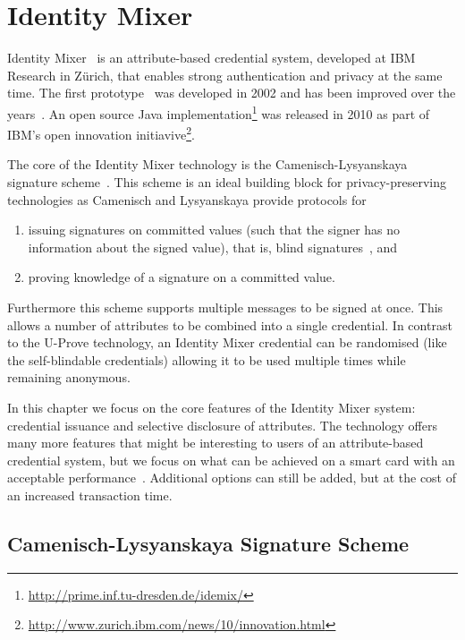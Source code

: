 \chapter{Identity Mixer}

Identity Mixer~\cite{CamenischLysyanskaya2001,IdemixCrypto2012} is an
attribute-based credential system, developed at IBM Research in Z\"urich, that
enables strong authentication and privacy at the same time. The first
prototype~\cite{CamenischH02} was developed in 2002 and has been improved over
the years~\cite{BrickellCC2004,CamenischGroth2004}. An open source Java
implementation\footnote{\url{http://prime.inf.tu-dresden.de/idemix/}} was
released in 2010 as part of IBM's open innovation
initiavive\footnote{\url{http://www.zurich.ibm.com/news/10/innovation.html}}.

The core of the Identity Mixer technology is the Camenisch-Lysyanskaya signature
scheme~\cite{CamenischLysyanskaya2003,Lysyanskaya2002}. This scheme is an ideal
building block for privacy-preserving technologies as Camenisch and Lysyanskaya
provide protocols for
\begin{enumerate}
  \item issuing signatures on committed values (such that the signer has no
    information about the signed value), that is, blind
    signatures~\cite{Chaum1983}, and
  \item proving knowledge of a signature on a committed value.
\end{enumerate}
Furthermore this scheme supports multiple messages to be signed at once. This
allows a number of attributes to be combined into a single credential. In
contrast to the U-Prove technology, an Identity Mixer credential can be
randomised (like the self-blindable credentials) allowing it to be used multiple
times while remaining anonymous.

In this chapter we focus on the core features of the Identity Mixer system:
credential issuance and selective disclosure of attributes. The technology
offers many more features that might be interesting to users of an
attribute-based credential system, but we focus on what can be achieved on a
smart card with an acceptable performance~\cite{VullersAlpar2013}. Additional
options can still be added, but at the cost of an increased transaction time.

\section{Camenisch-Lysyanskaya Signature Scheme\label{sec:CL-scheme}}

